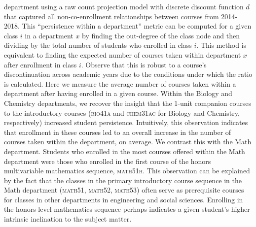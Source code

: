 department using a raw count projection model with discrete discount
function $d$ that captured all non-co-enrollment relationships between
courses from 2014-2018.  This ``persistence within a department''
metric can be computed for a given class $i$ in a department $x$ by
finding the out-degree of the class node and then dividing by the
total number of students who enrolled in class $i$. This method is
equivalent to finding the expected number of courses taken within
department $x$ after enrollment in class $i$. Observe that this is
robust to a course's discontinuation across academic years due to the
conditions under which the ratio is calculated. Here we measure the
average number of courses taken within a department after having
enrolled in a given course. Within the Biology and Chemistry
departments, we recover the insight that the 1-unit companion courses
to the introductory courses (\textsc{bio41a} and \textsc{chem31ac} for
Biology and Chemistry, respectively) increased student
persistence. Intuitively, this observation indicates that enrollment
in these courses led to an overall increase in the number of courses
taken within the department, on average. We contrast this with the
Math department. Students who enrolled in the most courses offered
within the Math department were those who enrolled in the first course
of the honors multivariable mathematics sequence,
\textsc{math51h}. This observation can be explained by the fact that
the classes in the primary introductory course sequence in the Math
department (\textsc{math51}, \textsc{math52}, \textsc{math53}) often
serve as prerequisite courses for classes in other departments in
engineering and social sciences. Enrolling in the honors-level
mathematics sequence perhaps indicates a given student's higher
intrinsic inclination to the subject matter.
